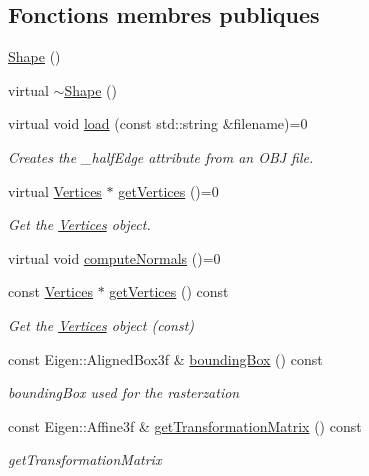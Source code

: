 \subsection*{Fonctions membres publiques}
\begin{DoxyCompactItemize}
\item 
\hyperlink{class_shape_aaa8d87171e65e0d8ba3c5459978992a7}{Shape} ()
\item 
virtual \hyperlink{class_shape_ac3b9fc48965274893f25b18aa14ba665}{$\sim$\+Shape} ()
\item 
virtual void \hyperlink{class_shape_a20d654ec232b682c36cd8b28d2cba750}{load} (const std\+::string \&filename)=0
\begin{DoxyCompactList}\small\item\em Creates the \+\_\+half\+Edge attribute from an O\+BJ file. \end{DoxyCompactList}\item 
virtual \hyperlink{struct_shape_1_1_vertices}{Vertices} $\ast$ \hyperlink{class_shape_a08ba4a861e979b8adffdbe615d048203}{get\+Vertices} ()=0
\begin{DoxyCompactList}\small\item\em Get the \hyperlink{struct_shape_1_1_vertices}{Vertices} object. \end{DoxyCompactList}\item 
virtual void \hyperlink{class_shape_afd886ad433d08a566003073bfd837f40}{compute\+Normals} ()=0
\item 
const \hyperlink{struct_shape_1_1_vertices}{Vertices} $\ast$ \hyperlink{class_shape_ac40943613d4b7480d305d807abeb01e0}{get\+Vertices} () const
\begin{DoxyCompactList}\small\item\em Get the \hyperlink{struct_shape_1_1_vertices}{Vertices} object (const) \end{DoxyCompactList}\item 
const Eigen\+::\+Aligned\+Box3f \& \hyperlink{class_shape_acd24561b01d6769b4a0c96cd0237a961}{bounding\+Box} () const
\begin{DoxyCompactList}\small\item\em bounding\+Box used for the rasterzation \end{DoxyCompactList}\item 
const Eigen\+::\+Affine3f \& \hyperlink{class_shape_a9a1f2d5c370b8c9194fc51ea37a03cac}{get\+Transformation\+Matrix} () const
\begin{DoxyCompactList}\small\item\em get\+Transformation\+Matrix \end{DoxyCompactList}\item 

\end{DoxyCompactItemize}
